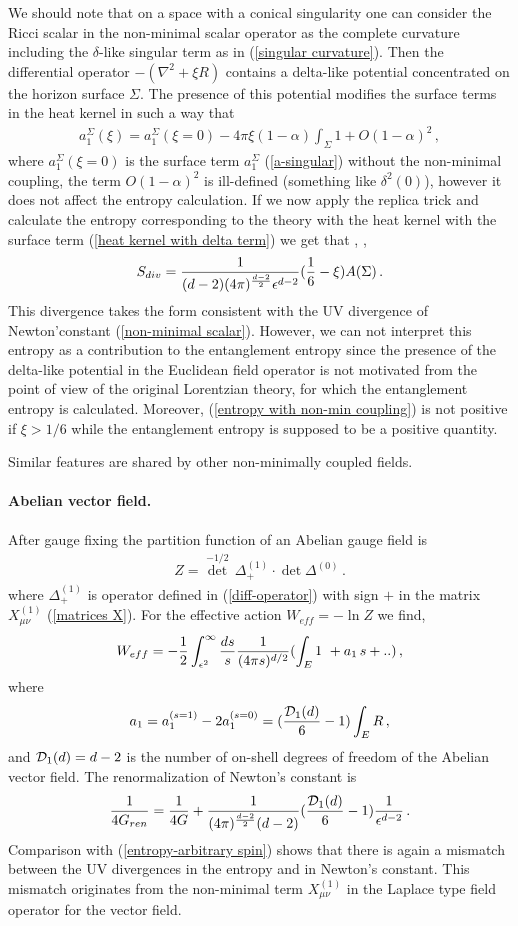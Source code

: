 \documentclass[12pt]{article}
\def\be{\begin{eqnarray}}
\def\ee{\end{eqnarray}}
\def\lb{\label}
\def\o{\over}
\begin{document}
We should note that on a space with a conical singularity one can  consider the Ricci scalar in the non-minimal scalar operator as the complete curvature including the $\delta$-like singular term as in  (\ref{singular curvature}). Then the differential operator $-(\nabla^2+\xi R)$ contains a  delta-like potential concentrated on the horizon surface $\Sigma$. 
The presence of this potential modifies the surface terms in the heat kernel in such a way that \cite{Solodukhin:1995ak}
\be
a_1^\Sigma(\xi)=a_1^\Sigma(\xi=0)-4\pi \xi (1-\alpha)\int_\Sigma 1+O(1-\alpha)^2\, ,
\lb{heat kernel with delta term}
\ee
where $a_1^\Sigma (\xi=0)$ is the surface term $a_1^\Sigma$  (\ref{a-singular}) without the non-minimal coupling, the term $O(1-\alpha)^2$ is ill-defined (something like $\delta^2(0)$),
however it does not affect the entropy calculation. If we now apply the replica trick and calculate the entropy corresponding to the theory with the heat kernel with the surface term (\ref{heat kernel with delta term}) we get that \cite{Solodukhin:1995ak}, \cite{Larsen:1995ax}, \cite{Barvinsky:1995dp}
\be
S_{div}={1\o (d-2)(4\pi)^{d-2\o 2}\epsilon^{d-2}}({1\o 6}-\xi)A(\Sigma)\, .
\lb{entropy with non-min coupling}
\ee
This divergence takes the form  consistent with the UV divergence   of Newton'constant (\ref{non-minimal scalar}). However, we can not interpret this entropy as a contribution to the entanglement entropy since the presence of the delta-like potential in the Euclidean field operator is not motivated from the point of view of the original Lorentzian theory, for which the entanglement entropy is calculated. Moreover, (\ref{entropy with non-min coupling}) is not positive  if $\xi>1/6$ while the entanglement entropy is supposed to be a  positive quantity.

\medskip

\noindent Similar features are shared by other non-minimally coupled fields.

\medskip

\paragraph*{Abelian vector field.} After  gauge fixing the partition function of an Abelian gauge field is 
\be
Z={\det}^{-1/2}\, \Delta_+^{(1)}\cdot \det \Delta^{(0)}\, .
\lb{Z-vector field}
\ee
where  $\Delta_+^{(1)}$ is operator defined in (\ref{diff-operator}) with sign $+$ in the matrix $X^{(1)}_{\mu\nu}$ (\ref{matrices X}). 
For the effective action $W_{eff}=-\ln Z$ we find,
\be
W_{eff}=-{1\o 2}\int_{\epsilon^2}^\infty {ds\o s}{1\o (4\pi s)^{d/2}}(\int_E 1\ +a_1 \, s+..)\, ,
\lb{W-vector}
\ee
where 
\be
a_1=a_1^{(s=1)}-2a_1^{(s=0)}=({{\cal D}_1(d)\o 6}  -1)\int_E R  \, ,
\lb{a1-vector}
\ee
and ${\cal D}_1(d)=d-2$ is the number of on-shell degrees of freedom of the Abelian vector field. The renormalization of Newton's constant is
\be
{1\o 4G_{ren}}={1\o 4G}+{1\o (4\pi)^{d-2\o 2}(d-2)} ( {{\cal D}_{1}(d)\o 6}-1) {1\o \epsilon^{d-2}}\, .
\lb{G-ren-vector-1}
\ee
Comparison with (\ref{entropy-arbitrary spin})  shows that there is again a mismatch between the UV divergences in the entropy and in Newton's
constant.  This mismatch originates  from the non-minimal term $X^{(1)}_{\mu\nu}$ in the Laplace type field operator for the vector field.
\end{document}
